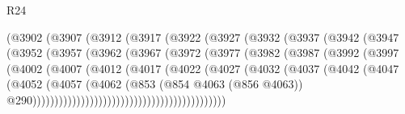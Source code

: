 \begin{lexlean}{R24}
\begin{coremodule}
                        (@3902
                          (@3907
                            (@3912
                              (@3917
                                (@3922
                                  (@3927
                                    (@3932
                                      (@3937
                                        (@3942
                                          (@3947
                                            (@3952
                                              (@3957
                                                (@3962
                                                  (@3967
                                                    (@3972
                                                      (@3977
                                                        (@3982
                                                          (@3987
                                                            (@3992
                                                              (@3997
                                                                (@4002
                                                                  (@4007
                                                                    (@4012
                                                                      (@4017
                                                                        (@4022
                                                                          (@4027
                                                                            (@4032
                                                                              (@4037
                                                                                (@4042
                                                                                  (@4047
                                                                                    (@4052
                                                                                      (@4057
                                                                                        (@4062
                                                                                          (@853
                                                                                            (@854
                                                                                              @4063
                                                                                              (@856
                                                                                                @4063))
                                                                                            @290))))))))))))))))))))))))))))))))))))))))))))

\end{coremodule}
\end{lexlean}
